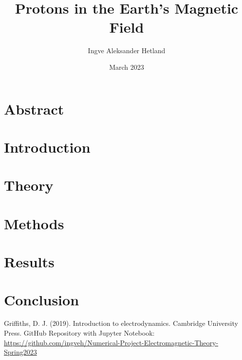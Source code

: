 \documentclass{article}
\title{Protons in the Earth's Magnetic Field}
\author{Ingve Aleksander Hetland}
\date{March 2023}
\begin{document}
\maketitle

\section{Abstract}


\section{Introduction}


\section{Theory}


\section{Methods}


\section{Results}


\section{Conclusion}


\begin{thebibliography}{9}
    Griffiths, D. J. (2019). Introduction to electrodynamics. Cambridge University Press.
    GitHub Repository with Jupyter Notebook: \url{https://github.com/ingveh/Numerical-Project-Electromagnetic-Theory-Spring2023}

\end{thebibliography}
\end{document}
